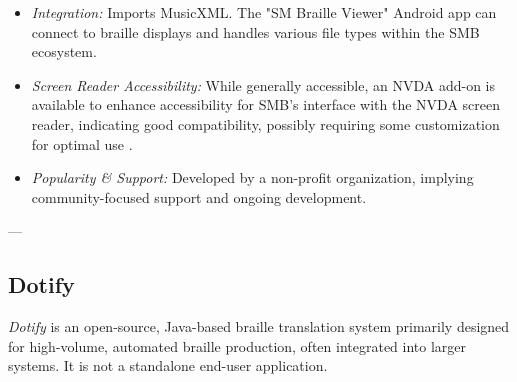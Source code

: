 \begin{itemize}
    \begin{itemize}
        \item \emph{Integration:} Imports MusicXML. The "SM Braille Viewer" Android app can connect to braille displays and handles various file types within the SMB ecosystem.
        \item \emph{Screen Reader Accessibility:} While generally accessible, an NVDA add-on is available to enhance accessibility for SMB's interface with the NVDA screen reader, indicating good compatibility, possibly requiring some customization for optimal use \cite{SMBNVDA}.
        \item \emph{Popularity \& Support:} Developed by a non-profit organization, implying community-focused support and ongoing development.
    \end{itemize}
\end{itemize}

---

\subsection{Dotify}
\emph{Dotify} is an open-source, Java-based braille translation system primarily designed for high-volume, automated braille production, often integrated into larger systems. It is not a standalone end-user application.

